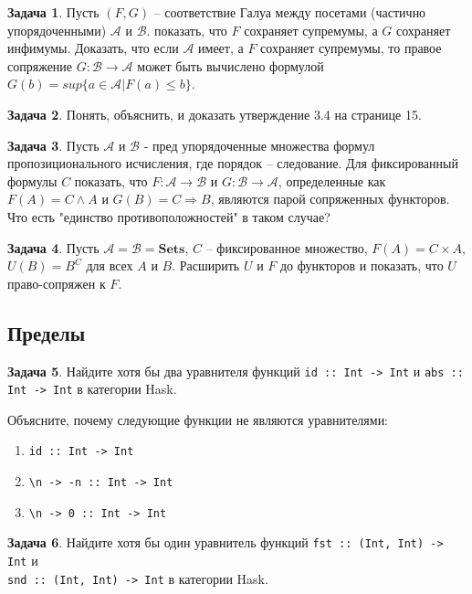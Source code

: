 \documentclass[10pt]{article}
\theoremstyle{definition}
\newtheorem{Pm}{Задача}[subsection]
\begin{document}
\begin{Pm}
    Пусть $(F, G)$ -- соответствие Галуа между посетами (частично упорядоченными) $\mathcal A$ и $\mathcal B$. показать, что $F$ сохраняет супремумы, а $G$ сохраняет инфимумы. Доказать, что если $\mathcal A$ имеет, а $F$ сохраняет супремумы, то правое сопряжение $G : \mathcal B \rightarrow \mathcal A$ может быть вычислено формулой $G(b) = sup \{a \in \mathcal A | F(a) \leq b \}$.
\end{Pm}

\begin{Pm}
    Понять, объяснить, и доказать утверждение 3.4 на странице 15.
\end{Pm}

\begin{Pm}
    Пусть $\mathcal A$ и $\mathcal B$ - пред упорядоченные множества формул пропозиционального исчисления, где порядок -- следование. Для фиксированный формулы $C$ показать, что $F : \mathcal A \rightarrow \mathcal B$ и $G : \mathcal B \rightarrow \mathcal A$, определенные как $F(A) = C \land A$ и $G(B) = C \Rightarrow B$, являются парой сопряженных функторов. Что есть "единство противоположностей" в таком случае?
\end{Pm}

\begin{Pm}
    Пусть $\mathcal A = \mathcal B = \mathbf{Sets}$, $C$ -- фиксированное множество, $F(A) = C \times A$, $U(B) = B^C$ для всех $A$ и $B$. Расширить $U$ и $F$ до функторов и показать, что $U$ право-сопряжен к $F$.
\end{Pm}

\subsection{Пределы}

\begin{Pm}
    Найдите хотя бы два уравнителя функций \verb|id :: Int -> Int| и \verb|abs :: Int -> Int| в категории Hask.

    Объясните, почему следующие функции не являются уравнителями:
    \begin{enumerate}
        \item \verb|id :: Int -> Int|
        \item \verb|\n -> -n :: Int -> Int|
        \item \verb|\n -> 0 :: Int -> Int|
    \end{enumerate}
\end{Pm}

\begin{Pm}
    Найдите хотя бы один уравнитель функций \verb|fst :: (Int, Int) -> Int| и \\ \verb|snd :: (Int, Int) -> Int| в категории Hask.
\end{Pm}
\end{document}
